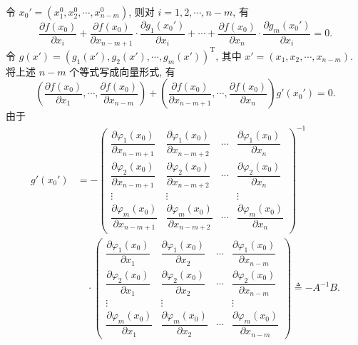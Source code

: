 \documentclass[UTF8, 12pt, fontset=fandol, oneside]{ctexart}
\begin{document}
令 $x_0'=(x_1^0,x_2^0,\cdots,x_{n-m}^0)$, 则对 $i=1,2,\cdots,n-m$, 有
\[
  \frac{\partial f(x_0)}{\partial x_i}
  +\frac{\partial f(x_0)}{\partial x_{n-m+1}}\cdot
  \frac{\partial g_1(x_0')}{\partial x_i}
  +\cdots+
  \frac{\partial f(x_0)}{\partial x_n}\cdot
  \frac{\partial g_m(x_0')}{\partial x_i}
  =0.
\]
令 $g(x')=(g_1(x'),g_2(x'),\cdots,g_m(x'))^{\mathrm T}$, 其中 $x'=(x_1,x_2,\cdots,x_{n-m})$. 将上述 $n-m$ 个等式写成向量形式, 有
\begin{equation}
  \left(
    \frac{\partial f(x_0)}{\partial x_1},
    \cdots,
    \frac{\partial f(x_0)}{\partial x_{n-m}}
  \right)
  +
  \left(
    \frac{\partial f(x_0)}{\partial x_{n-m+1}},
    \cdots,
    \frac{\partial f(x_0)}{\partial x_n}
  \right)
  g'(x_0')=0.
  \tag{14.5.4}
\end{equation}
由于
\begin{equation}
\begin{aligned}
  g'(x_0')
  &=
  -
  \begin{pmatrix}
    \dfrac{\partial\varphi_1(x_0)}{\partial x_{n-m+1}} &
    \dfrac{\partial\varphi_1(x_0)}{\partial x_{n-m+2}} &
    \cdots &
    \dfrac{\partial\varphi_1(x_0)}{\partial x_n}\\
    \dfrac{\partial\varphi_2(x_0)}{\partial x_{n-m+1}} &
    \dfrac{\partial\varphi_2(x_0)}{\partial x_{n-m+2}} &
    \cdots &
    \dfrac{\partial\varphi_2(x_0)}{\partial x_n}\\
    \vdots & \vdots & & \vdots\\
    \dfrac{\partial\varphi_m(x_0)}{\partial x_{n-m+1}} &
    \dfrac{\partial\varphi_m(x_0)}{\partial x_{n-m+2}} &
    \cdots &
    \dfrac{\partial\varphi_m(x_0)}{\partial x_n}
  \end{pmatrix}^{-1}\\
  &\quad\cdot
  \begin{pmatrix}
    \dfrac{\partial\varphi_1(x_0)}{\partial x_1} &
    \dfrac{\partial\varphi_1(x_0)}{\partial x_2} &
    \cdots &
    \dfrac{\partial\varphi_1(x_0)}{\partial x_{n-m}}\\
    \dfrac{\partial\varphi_2(x_0)}{\partial x_1} &
    \dfrac{\partial\varphi_2(x_0)}{\partial x_2} &
    \cdots &
    \dfrac{\partial\varphi_2(x_0)}{\partial x_{n-m}}\\
    \vdots & \vdots & & \vdots\\
    \dfrac{\partial\varphi_m(x_0)}{\partial x_1} &
    \dfrac{\partial\varphi_m(x_0)}{\partial x_2} &
    \cdots &
    \dfrac{\partial\varphi_m(x_0)}{\partial x_{n-m}}
  \end{pmatrix}
  \triangleq -A^{-1}B.
\end{aligned}
\tag{14.5.5}
\end{equation}
\end{document}
